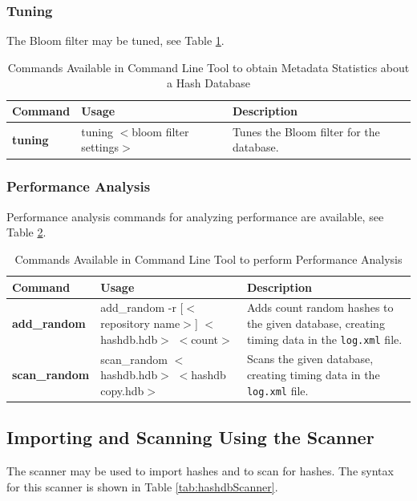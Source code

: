 \documentclass[11pt,fleqn]{article} %
\begin{document}
\subsubsection{Tuning}
The Bloom filter may be tuned, see Table \ref{tab:tuning}.

\begin{table}[!ht]
\centering
\caption{Commands Available in \hash Command Line Tool to obtain Metadata Statistics about a Hash Database}
\label{tab:tuning}
\begin{tabular}{|p{3.5 cm}|p{6 cm}|p{4 cm}|}
\hline \hline
\textbf{Command} & \textbf{Usage} & \textbf{Description} \\
\hline
\textbf{tuning} &  tuning $<$bloom filter settings$>$ & Tunes the Bloom filter for the database.\\
\hline
\end{tabular}
\end{table}

\subsubsection{Performance Analysis}
Performance analysis commands for analyzing \hash performance are available, see Table \ref{tab:analysis}.

\begin{table}[!ht]
\centering
\caption{Commands Available in \hash Command Line Tool to perform \hash Performance Analysis}
\label{tab:analysis}
\begin{tabular}{|p{3.5 cm}|p{6 cm}|p{4 cm}|}
\hline \hline
\textbf{Command} & \textbf{Usage} & \textbf{Description} \\
\hline
\textbf{add\_random} & add\_random -r [$<$repository name$>$] $<$hashdb.hdb$>$ $<$count$>$ & Adds count random hashes to the given database, creating timing data in the \texttt{log.xml} file.\\
\hline
\textbf{scan\_random} & scan\_random $<$hashdb.hdb$>$ $<$hashdb copy.hdb$>$ & Scans the given database, creating timing data in the \texttt{log.xml} file.\\
\hline
\end{tabular}
\end{table}

\subsection{Importing and Scanning Using the \bulk \hash Scanner}
The \bulk \hash scanner may be used to import hashes and to scan for hashes.
The syntax for this scanner is shown in Table \ref{tab:hashdbScanner}.
\end{document}
